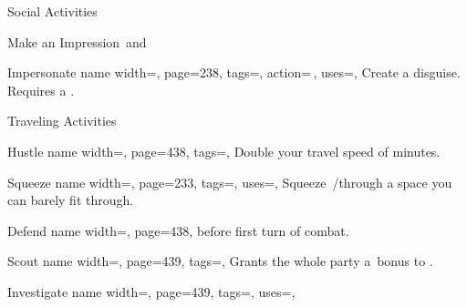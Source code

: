 \begin{PageFrontLandscape}
\begin{TablesHalf}{\frontTableHeight}
\begin{Table}{Social Activities}
\begin{entry}{Make an Impression}
                \quad\Auditory\,and \Linguistic
            \end{entry}
            \begin{entry}{Impersonate}{%
                name width=\activityLength,%
                page=238,
                tags=\Concentrate\Manipulate,
                action=\,,
                uses={\Deception[tags={S}]},
            }
                Create a disguise. Requires a . \hfill
            \end{entry}
        \end{Table}
        \TableSpace
        \begin{Table}{Traveling Activities}
            \begin{entry}{Hustle}{%
                name width=\activityLength,%
                page=438,
                tags=\Move,
            }
                Double your travel speed of  minutes.\quad
            \end{entry}
            \begin{entry}{Squeeze}{%
                name width=\activityLength,%
                page=233,
                tags=\Move,
                uses={\Acrobatics[tags=T]},
            }
                Squeeze \,\Feet/\Min through a space you can barely fit through. \hfill
            \end{entry}
            \begin{entry}{Defend}{%
                name width=\activityLength,%
                page=438,
            }
                 before first turn of combat.\hfill
            \end{entry}
            \begin{entry}{Scout}{%
                name width=\activityLength,%
                page=439,
                tags=\Concentrate,
            }
                Grants the whole party a \,\Cirm bonus to .
            \end{entry}
            \breakLine
            \begin{entry}{Investigate}{%
                name width=\activityLength,%
                page=439,
                tags=\Concentrate,
                uses={\VariousKnowledge[tags=S]},
            }

\end{entry}
\end{Table}
\end{TablesHalf}
\end{PageFrontLandscape}
